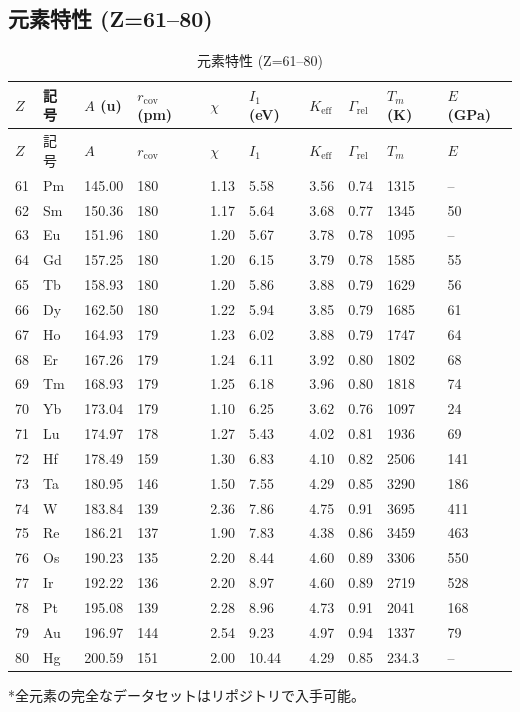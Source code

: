 \documentclass[11pt,a4paper]{article}
\newcommand{\Keff}{K_{\mathrm{eff}}}
\theoremstyle{remark}
\begin{document}
	\subsection*{元素特性 (Z=61–80)}
	
	\begin{longtable}{p{0.6cm}p{1.2cm}p{1.2cm}p{1.2cm}p{1.2cm}p{1.2cm}p{1.5cm}p{1.2cm}p{1.2cm}p{1.2cm}}
		\caption{元素特性 (Z=61–80)} \label{tab:elem-data-61to80} \\
		\toprule
		\(Z\) & 記号 & \(A\) (u) & \(r_{\text{cov}}\) (pm) & \(\chi\) & \(I_1\) (eV) & \(\Keff\) & \(\Gamma_{\text{rel}}\) & \(T_m\) (K) & \(E\) (GPa) \\
		\midrule
		\endfirsthead
		\toprule
		\(Z\) & 記号 & \(A\) & \(r_{\text{cov}}\) & \(\chi\) & \(I_1\) & \(\Keff\) & \(\Gamma_{\text{rel}}\) & \(T_m\) & \(E\) \\
		\midrule
		\endhead
		61 & Pm & 145.00 & 180 & 1.13 & 5.58 & 3.56 & 0.74 & 1315 & – \\
		62 & Sm & 150.36 & 180 & 1.17 & 5.64 & 3.68 & 0.77 & 1345 & 50 \\
		63 & Eu & 151.96 & 180 & 1.20 & 5.67 & 3.78 & 0.78 & 1095 & – \\
		64 & Gd & 157.25 & 180 & 1.20 & 6.15 & 3.79 & 0.78 & 1585 & 55 \\
		65 & Tb & 158.93 & 180 & 1.20 & 5.86 & 3.88 & 0.79 & 1629 & 56 \\
		66 & Dy & 162.50 & 180 & 1.22 & 5.94 & 3.85 & 0.79 & 1685 & 61 \\
		67 & Ho & 164.93 & 179 & 1.23 & 6.02 & 3.88 & 0.79 & 1747 & 64 \\
		68 & Er & 167.26 & 179 & 1.24 & 6.11 & 3.92 & 0.80 & 1802 & 68 \\
		69 & Tm & 168.93 & 179 & 1.25 & 6.18 & 3.96 & 0.80 & 1818 & 74 \\
		70 & Yb & 173.04 & 179 & 1.10 & 6.25 & 3.62 & 0.76 & 1097 & 24 \\
		71 & Lu & 174.97 & 178 & 1.27 & 5.43 & 4.02 & 0.81 & 1936 & 69 \\
		72 & Hf & 178.49 & 159 & 1.30 & 6.83 & 4.10 & 0.82 & 2506 & 141 \\
		73 & Ta & 180.95 & 146 & 1.50 & 7.55 & 4.29 & 0.85 & 3290 & 186 \\
		74 & W  & 183.84 & 139 & 2.36 & 7.86 & 4.75 & 0.91 & 3695 & 411 \\
		75 & Re & 186.21 & 137 & 1.90 & 7.83 & 4.38 & 0.86 & 3459 & 463 \\
		76 & Os & 190.23 & 135 & 2.20 & 8.44 & 4.60 & 0.89 & 3306 & 550 \\
		77 & Ir & 192.22 & 136 & 2.20 & 8.97 & 4.60 & 0.89 & 2719 & 528 \\
		78 & Pt & 195.08 & 139 & 2.28 & 8.96 & 4.73 & 0.91 & 2041 & 168 \\
		79 & Au & 196.97 & 144 & 2.54 & 9.23 & 4.97 & 0.94 & 1337 & 79 \\
		80 & Hg & 200.59 & 151 & 2.00 & 10.44 & 4.29 & 0.85 & 234.3 & – \\
		\bottomrule
	\end{longtable}
	*全元素の完全なデータセットはリポジトリで入手可能。
	
\end{document}
